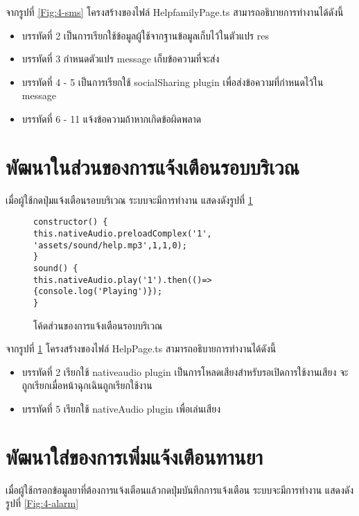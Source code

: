 จากรูปที่ \ref{Fig:4-sms} โครงสร้างของไฟล์ HelpfamilyPage.ts สามารถอธิบายการทำงานได้ดังนี้
\begin{itemize}[label={--}]
\item บรรทัดที่ 2 เป็นการเรียกใช้ข้อมูลผู้ใช้จากฐานข้อมูลเก็บไว้ในตัวแปร res
\item บรรทัดที่ 3 กำหนดตัวแปร message เก็บข้อความที่จะส่ง
\item บรรทัดที่ 4 - 5 เป็นการเรียกใช้ socialSharing plugin เพื่อส่งข้อความที่กำหนดไว้ใน message
\item บรรทัดที่ 6 - 11 แจ้งข้อความถ้าหากเกิดข้อผิดพลาด
\end{itemize}
\newpage



\section{พัฒนาในส่วนของการแจ้งเตือนรอบบริเวณ}
เมื่อผู้ใช้กดปุ่มแจ้งเตือนรอบบริเวณ ระบบจะมีการทำงาน แสดงดังรูปที่ \ref{Fig:4-danger}

\begin{figure}[H]
{\lstset{language=Pascal}
\begin{lstlisting}
constructor() {
this.nativeAudio.preloadComplex('1', 'assets/sound/help.mp3',1,1,0);
}
sound() {
this.nativeAudio.play('1').then(()=>{console.log('Playing')});
}
\end{lstlisting}}
\caption{โค้ดส่วนของการแจ้งเตือนรอบบริเวณ}
\label{Fig:4-danger}
\end{figure}

จากรูปที่ \ref{Fig:4-danger} โครงสร้างของไฟล์ HelpPage.ts สามารถอธิบายการทำงานได้ดังนี้
\begin{itemize}[label={--}]
\item บรรทัดที่ 2 เรียกใช้ nativeaudio plugin เป็นการโหลดเสียงสำหรับรอเปิดการใช้งานเสียง จะถูกเรียกเมื่อหน้าฉุกเฉินถูกเรียกใช้งาน
\item บรรทัดที่ 5 เรียกใช้ nativeAudio plugin เพื่อเล่นเสียง
\end{itemize}
\newpage



\section{พัฒนาใส่ของการเพิ่มแจ้งเตือนทานยา}
เมื่อผู้ใช้กรอกข้อมูลยาที่ต้องการแจ้งเตือนแล้วกดปุ่มบันทึกการแจ้งเตือน ระบบจะมีการทำงาน แสดงดังรูปที่ \ref{Fig:4-alarm}

